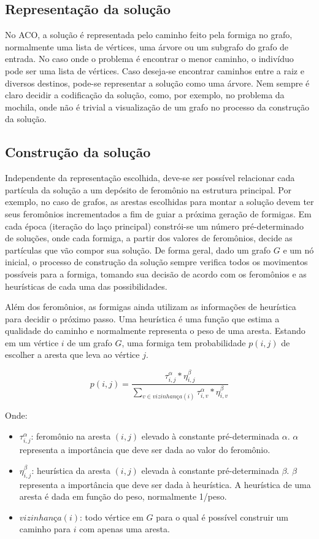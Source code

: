\subsection{Representação da solução}
No ACO, a solução é representada pelo caminho feito pela formiga no grafo, normalmente uma lista de vértices, uma árvore ou um subgrafo do grafo de entrada. No caso onde o problema é encontrar o menor caminho, o indivíduo pode ser uma lista de vértices. Caso deseja-se encontrar caminhos entre a raiz e diversos destinos, pode-se representar a solução como uma árvore. Nem sempre é claro decidir a codificação da solução, como, por exemplo, no problema da mochila, onde não é trivial a visualização de um grafo no processo da construção da solução.

\subsection{Construção da solução}
Independente da representação escolhida, deve-se ser possível relacionar cada partícula da solução a um depósito de feromônio na estrutura principal. Por exemplo, no caso de grafos, as arestas escolhidas para montar a solução devem ter seus feromônios incrementados a fim de guiar a próxima geração de formigas. Em cada época (iteração do laço principal) constrói-se um número pré-determinado de soluções, onde cada formiga, a partir dos valores de feromônios, decide as partículas que vão compor sua solução. De forma geral, dado um grafo $G$ e um nó inicial, o processo de construção da solução sempre verifica todos os movimentos possíveis para a formiga, tomando sua decisão de acordo com os feromônios e as heurísticas de cada uma das possibilidades. 

Além dos feromônios, as formigas ainda utilizam as informações de heurística para decidir o próximo passo. Uma heurística é uma função que estima a qualidade do caminho e normalmente representa o peso de uma aresta. Estando em um vértice $i$ de um grafo $G$, uma formiga tem probabilidade $p(i,j)$ de escolher a aresta que leva ao vértice $j$.

\[ p(i,j) = \frac{\tau_{i,j}^\alpha * \eta_{i,j}^\beta}{\sum_{v \in vizinhança(i)} \tau_{i,v}^\alpha * \eta_{i,v}^\beta} \]

Onde:

\begin{itemize}  
	\item $\tau_{i,j}^\alpha$: feromônio na aresta $(i,j)$ elevado à constante pré-determinada $\alpha$. $\alpha$ representa a importância que deve ser dada ao valor do feromônio.
	\item $\eta_{i,j}^\beta$: heurística da aresta $(i,j)$ elevada à constante pré-determinada $\beta$. $\beta$ representa a importância que deve ser dada à heurística. A heurística de uma aresta é dada em função do peso, normalmente 1/peso.
	\item $vizinhança(i)$: todo vértice em $G$ para o qual é possível construir um caminho para $i$ com apenas uma aresta.
\end{itemize}


